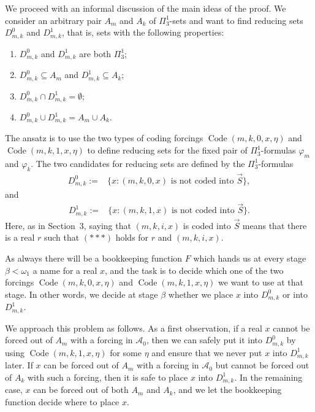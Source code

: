 \documentclass[a4paper,11pt]{article}
\begin{document}
We proceed with an informal discussion of the main ideas of the proof. We consider an arbitrary pair $A_m$ and $A_k$ of $\Pi^1_3$-sets and want to find reducing sets $D^0_{m,k}$ and $D^1_{m,k}$, that is, sets with the following properties:
\begin{enumerate}
\item $D^0_{m,k}$ and $D^1_{m,k}$ are both $\Pi^1_3$;
\item $D^0_{m,k}\subseteq A_m$ and $D^1_{m,k}\subseteq A_k$;
\item $D^0_{m,k}\cap D^1_{m,k}=\emptyset$;
\item $D^0_{m,k}\cup D^1_{m,k}=A_m\cup A_k$.
\end{enumerate}

The ansatz is to use the two types of coding forcings $\operatorname{Code}(m,k,0,x,\eta)$ and $\operatorname{Code}(m,k,1,x,\eta)$ to define reducing sets for the fixed pair of $\Pi^1_3$-formulas $\varphi_m$ and $\varphi_k$. The two candidates for reducing sets are defined by the $\Pi^1_3$-formulas
\begin{align*}
D^0_{m,k}:={}&\{x:(m,k,0,x)\text{ is not coded into }\vec S\},
\end{align*}
and
\begin{align*}
D^1_{m,k}:={}&\{x:(m,k,1,x)\text{ is not coded into }\vec S\}.
\end{align*}
Here, as in Section~3, saying that $(m,k,i,x)$ is coded into $\vec S$ means that there is a real $r$ such that $({\ast}{\ast}{\ast})$ holds for $r$ and $(m,k,i,x)$.

As always there will be a bookkeeping function $F$ which hands us at every stage $\beta<\omega_1$ a name for a real $x$, and the task is to decide which one of the two forcings $\operatorname{Code}(m,k,0,x,\eta)$ and $\operatorname{Code}(m,k,1,x,\eta)$ we want to use at that stage. In other words, we decide at stage $\beta$ whether we place $x$ into $D^0_{m,k}$ or into $D^1_{m,k}$.

We approach this problem as follows. As a first observation, if a real $x$ cannot be forced out of $A_m$ with a forcing in $\mathcal A_0$, then we can safely put it into $D^0_{m,k}$ by using $\operatorname{Code}(m,k,1,x,\eta)$ for some $\eta$ and ensure that we never put $x$ into $D^1_{m,k}$ later. If $x$ can be forced out of $A_m$ with a forcing in $\mathcal A_0$ but cannot be forced out of $A_k$ with such a forcing, then it is safe to place $x$ into $D^1_{m,k}$. In the remaining case, $x$ can be forced out of both $A_m$ and $A_k$, and we let the bookkeeping function decide where to place $x$.
\end{document}
